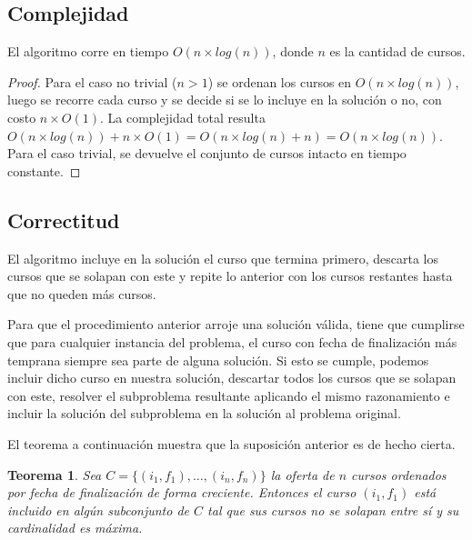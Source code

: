 \documentclass[a4paper, 10pt, twoside]{article}
\begin{document}
\subsection{Complejidad}

El algoritmo corre en tiempo $O(n \times log(n))$, donde $n$ es la cantidad de cursos.

\begin{proof}
    Para el caso no trivial ($n > 1$) se ordenan los cursos en $O(n \times log(n))$, luego se recorre cada curso y se decide si se lo incluye en la solución o no, con costo $n \times O(1)$. La complejidad total resulta $O(n \times log(n)) + n \times O(1) = O(n \times log(n) + n) = O(n \times log(n))$. Para el caso trivial, se devuelve el conjunto de cursos intacto en tiempo constante.
\end{proof}


\subsection{Correctitud}

El algoritmo incluye en la solución el curso que termina primero, descarta los cursos que se solapan con este y repite lo anterior con los cursos restantes hasta que no queden más cursos.

Para que el procedimiento anterior arroje una solución válida, tiene que cumplirse que para cualquier instancia del problema, el curso con fecha de finalización más temprana siempre sea parte de alguna solución. Si esto se cumple, podemos incluir dicho curso en nuestra solución, descartar todos los cursos que se solapan con este, resolver el subproblema resultante aplicando el mismo razonamiento e incluir la solución del subproblema en la solución al problema original.

El teorema a continuación muestra que la suposición anterior es de hecho cierta.

\newtheorem*{teorema-ej2}{Teorema}

\begin{teorema-ej2}
    Sea $C = \{ (i_1, f_1), \ldots, (i_n, f_n) \}$ la oferta de $n$ cursos ordenados por fecha de finalización de forma creciente. Entonces el curso $(i_1, f_1)$ está incluido en algún subconjunto de $C$ tal que sus cursos no se solapan entre sí y su cardinalidad es máxima.
\end{teorema-ej2}
\end{document}
